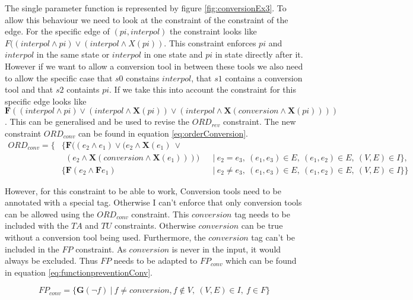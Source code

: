 \documentclass{article}
\begin{document}
The single parameter function is represented by figure \ref{fig:conversionEx3}. To allow this behaviour we need to look at the constraint of the constraint of the edge. For the specific edge of $(pi,interpol)$ the constraint looks like $F((interpol \wedge pi) \vee (interpol \wedge X(pi))$. This constraint enforces $pi$ and $interpol$ in the same state or $interpol$ in one state and $pi$ in state directly after it. However if we want to allow a conversion tool in between these tools we also need to allow the specific case that $s0$ constains $interpol$, that $s1$ contains a conversion tool and that $s2$ containts $pi$. If we take this into account the constraint for this specific edge looks like $\textbf{F}((interpol \wedge pi) \vee (interpol \wedge \textbf{X}(pi)) \vee (interpol \wedge \textbf{X}(conversion \wedge \textbf{X}(pi))))$. This can be generalised and be used to revise the $ORD_{rev}$ constraint. The new constraint $ORD_{conv}$ can be found in equation \ref{eq:orderConversion}.
    \begin{align}
        ORD_{conv} =\{& \{\textbf{F}((e_2 \wedge e_1) \vee (e_2 \wedge \textbf{X} (e_1)\ \vee \nonumber \\ 
        &\ \ (e_2 \wedge \textbf{X}(conversion \wedge \textbf{X}(e_1)))  )&  &|\ e_2 = e_3,\ (e_1,e_3) \in  E ,\ (e_1,e_2) \in  E ,\ (V,E) \in  I  \}, \nonumber \\
        &\{\textbf{F}(e_2 \wedge \textbf{F} e_1) &  &|\ e_2 \not= e_3,\ (e_1,e_3) \in  E ,\ (e_1,e_2) \in  E,\    (V,E) \in I\}\} \label{eq:orderConversion}
\end{align}
 
 However, for this constraint to be able to work, Conversion tools need to be annotated with a special tag. Otherwise I can't enforce that only conversion tools can be allowed using the $ORD_{conv}$ constraint. This $conversion$ tag needs to be included with the $TA$ and $TU$ constraints. Otherwise $conversion$ can be true without a conversion tool being used. Furthermore, the $conversion$ tag can't be included in the $FP$ constraint. As $conversion$ is never in the input, it would always be excluded. Thus $FP$ needs to be adapted to $FP_{conv}$ which can be found in equation \ref{eq:functionpreventionConv}.
 
 \begin{equation}
         FP_{conv} = \{ \textbf{G}(\neg f)    \ |\ f\not= conversion , f \notin V,\ (V,E) \in I,\ f \in F\} \label{eq:functionpreventionConv}
 \end{equation}
 
\end{document}
